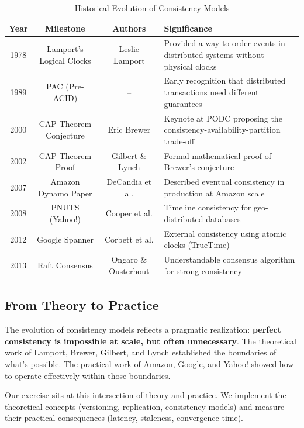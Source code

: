 \documentclass[10pt,a4paper]{article}
\begin{document}
\begin{table}[H]
\centering
\caption{Historical Evolution of Consistency Models}
\begin{tabular}{|c|c|c|p{5cm}|}
\hline
\textbf{Year} & \textbf{Milestone} & \textbf{Authors} & \textbf{Significance} \\
\hline
1978 & Lamport's Logical Clocks & Leslie Lamport & Provided a way to order events in distributed systems without physical clocks \\
\hline
1989 & PAC (Pre-ACID) & -- & Early recognition that distributed transactions need different guarantees \\
\hline
2000 & CAP Theorem Conjecture & Eric Brewer & Keynote at PODC proposing the consistency-availability-partition trade-off \\
\hline
2002 & CAP Theorem Proof & Gilbert \& Lynch & Formal mathematical proof of Brewer's conjecture \\
\hline
2007 & Amazon Dynamo Paper & DeCandia et al. & Described eventual consistency in production at Amazon scale \\
\hline
2008 & PNUTS (Yahoo!) & Cooper et al. & Timeline consistency for geo-distributed databases \\
\hline
2012 & Google Spanner & Corbett et al. & External consistency using atomic clocks (TrueTime) \\
\hline
2013 & Raft Consensus & Ongaro \& Ousterhout & Understandable consensus algorithm for strong consistency \\
\hline
\end{tabular}
\end{table}

\subsection{From Theory to Practice}

The evolution of consistency models reflects a pragmatic realization: \textbf{perfect consistency is impossible at scale, but often unnecessary}. The theoretical work of Lamport, Brewer, Gilbert, and Lynch established the boundaries of what's possible. The practical work of Amazon, Google, and Yahoo! showed how to operate effectively within those boundaries.

Our exercise sits at this intersection of theory and practice. We implement the theoretical concepts (versioning, replication, consistency models) and measure their practical consequences (latency, staleness, convergence time).
\end{document}

